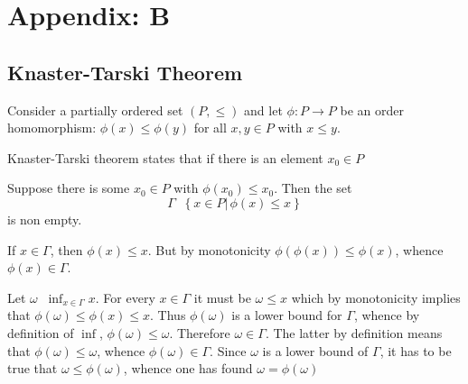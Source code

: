 \documentclass[a4paper]{article}
\newcommand{\obj}[1]{{\left\{ #1 \right \}}}
\newcommand{\brac}[1]{{\left ( #1 \right )}}
\newcommand{\induc}[1]{{\left . #1 \right \vert}}
\newcommand{\defn}{\mathop{\overset{\Delta}{=}}\nolimits}
\begin{document}




\section{Appendix: B} %
\label{sec:appendix_b}

\subsection{Knaster-Tarski Theorem} %
\label{sub:knaster_tarski_theorem}

Consider a partially ordered set $(P,\leq)$ and let $\phi:P\to P$ be an order homomorphism: $\phi(x) \leq \phi(y)$ for all $x,y\in P$ with $x\leq y$.

Knaster-Tarski theorem states that if there is an element $x_0\in P$

Suppose there is some $x_0\in P$ with $\phi(x_0)\leq x_0$. Then the set \[\Gamma \defn \obj{ \induc{x\in P}\,\phi(x)\leq x}\] is non empty.

If $x\in \Gamma$, then $\phi(x)\leq x$. But by monotonicity $\phi\brac{\phi(x)}\leq \phi(x)$, whence $\phi(x)\in \Gamma$.

Let $\omega \defn \inf_{x\in \Gamma} x$. For every $x\in \Gamma$ it must be $\omega\leq x$ which by monotonicity implies that $\phi(\omega)\leq \phi(x)\leq x$. Thus $\phi(\omega)$ is a lower bound for $\Gamma$, whence by definition of $\inf$, $\phi(\omega)\leq \omega$. Therefore $\omega\in \Gamma$. The latter by definition means that $\phi(\omega)\leq \omega$, whence $\phi(\omega)\in \Gamma$. Since $\omega$ is a lower bound of $\Gamma$, it has to be true that $\omega \leq \phi(\omega)$, whence one has found $\omega = \phi(\omega)$


\end{document}
